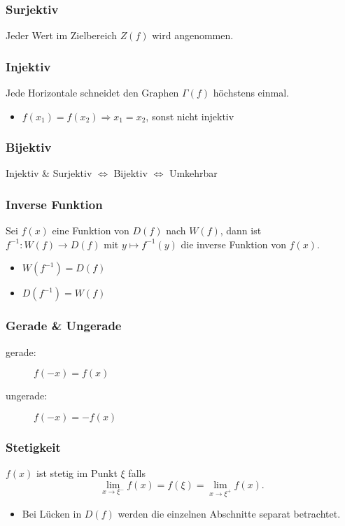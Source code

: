         \subsubsection{Surjektiv}
            Jeder Wert im Zielbereich $Z(f)$ wird angenommen.
        \subsubsection{Injektiv}
            Jede Horizontale schneidet den Graphen $\Gamma(f)$ höchstens einmal.
            \begin{itemize}
                \item $f(x_1) = f(x_2) \Rightarrow x_1 = x_2$, sonst nicht injektiv
            \end{itemize}
        \subsubsection{Bijektiv}
            \begin{center}
                Injektiv \& Surjektiv $\Leftrightarrow$ Bijektiv $\Leftrightarrow$ Umkehrbar
            \end{center}
        \subsubsection{Inverse Funktion}
            Sei $f(x)$ eine Funktion von $D(f)$ nach $W(f)$, dann ist $f^{-1}: W(f) \to D(f)$ mit $y \mapsto f^{-1}(y)$ die inverse Funktion von $f(x)$.
            \begin{itemize}
                \item $W(f^{-1}) = D(f)$
                \item $D(f^{-1}) = W(f)$
            \end{itemize}
        \subsubsection{Gerade \& Ungerade}
            \begin{description}
                \item[gerade:]\phantom{as} $f(-x) = f(x)$ 
                \item[ungerade:] $f(-x) = -f(x)$ 
            \end{description}
        \subsubsection{Stetigkeit}
            $f(x)$ ist stetig im Punkt $\xi$ falls
            $$
                \lim_{x\to\xi^-} f(x) = f(\xi) = \lim_{x\to\xi^+} f(x).
            $$
            \begin{itemize}
                \item Bei Lücken in $D(f)$ werden die einzelnen Abschnitte separat betrachtet.
            \end{itemize}
